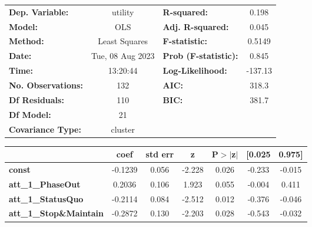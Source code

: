 \begin{center}
\begin{tabular}{lclc}
\toprule
\textbf{Dep. Variable:}                             &     utility      & \textbf{  R-squared:         } &     0.198   \\
\textbf{Model:}                                     &       OLS        & \textbf{  Adj. R-squared:    } &     0.045   \\
\textbf{Method:}                                    &  Least Squares   & \textbf{  F-statistic:       } &    0.5149   \\
\textbf{Date:}                                      & Tue, 08 Aug 2023 & \textbf{  Prob (F-statistic):} &    0.845    \\
\textbf{Time:}                                      &     13:20:44     & \textbf{  Log-Likelihood:    } &   -137.13   \\
\textbf{No. Observations:}                          &         132      & \textbf{  AIC:               } &     318.3   \\
\textbf{Df Residuals:}                              &         110      & \textbf{  BIC:               } &     381.7   \\
\textbf{Df Model:}                                  &          21      & \textbf{                     } &             \\
\textbf{Covariance Type:}                           &     cluster      & \textbf{                     } &             \\
\bottomrule
\end{tabular}
\begin{tabular}{lcccccc}
                                                    & \textbf{coef} & \textbf{std err} & \textbf{z} & \textbf{P$> |$z$|$} & \textbf{[0.025} & \textbf{0.975]}  \\
\midrule
\textbf{const}                                      &      -0.1239  &        0.056     &    -2.228  &         0.026        &       -0.233    &       -0.015     \\
\textbf{att\_1\_PhaseOut}                           &       0.2036  &        0.106     &     1.923  &         0.055        &       -0.004    &        0.411     \\
\textbf{att\_1\_StatusQuo}                          &      -0.2114  &        0.084     &    -2.512  &         0.012        &       -0.376    &       -0.046     \\
\textbf{att\_1\_Stop\&Maintain}                     &      -0.2872  &        0.130     &    -2.203  &         0.028        &       -0.543    &       -0.032     \\

\end{tabular}
\end{center}
